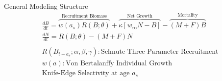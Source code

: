 \documentclass[ xcolor = pdftex, dvipsnames, table ]{beamer}
\begin{document}
%
\begin{frame}{General Modeling Structure}
\begin{align*}%
&\frac{dB}{dt} = \overbrace{w(a_s)R(B;\theta)}^\text{Recruitment Biomass} + \overbrace{\kappa \left[w_\infty N-B\right]}^\text{Net Growth} - \overbrace{(M+F)B}^\text{Mortality} \\%
&\frac{dN}{dt} = R(B;\theta) - (M+F)N \\%
&~\\
&R(B_{t-a_s}; \alpha, \beta, \gamma): \text{Schnute Three Parameter Recruitment}\\
&w(a) : \text{Von Bertalanffy Individual Growth}\\
&\text{Knife-Edge Selectivity at age $a_s$}\\
\end{align*}
\end{frame}
\end{document}
